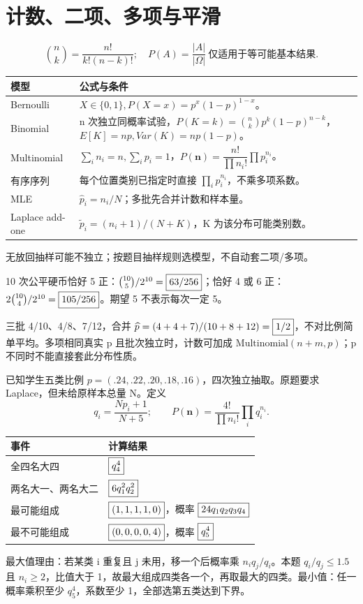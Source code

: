 \section{计数、二项、多项与平滑}\label{sec:prob}
\[
\binom nk=\frac{n!}{k!(n-k)!};\quad
P(A)=\frac{|A|}{|\Omega|}\ \text{仅适用于等可能基本结果}.
\]
\par\noindent\begin{tabularx}{\textwidth}{lY}
\toprule 模型 & 公式与条件\\\midrule
Bernoulli & $X\in\{0,1\},P(X=x)=p^x(1-p)^{1-x}$。\\
Binomial & n 次独立同概率试验，$P(K=k)=\binom nkp^k(1-p)^{n-k}$，$E[K]=np,Var(K)=np(1-p)$。\\
Multinomial & $\sum_i n_i=n,\sum_i p_i=1$，$P(\mathbf n)=\dfrac{n!}{\prod n_i!}\prod p_i^{n_i}$。\\
有序序列 & 每个位置类别已指定时直接 $\prod_i p_i^{n_i}$，不乘多项系数。\\
MLE & $\widehat p_i=n_i/N$；多批先合并计数和样本量。\\
Laplace add-one & $\widetilde p_i=(n_i+1)/(N+K)$，K 为该分布可能类别数。\\\bottomrule
\end{tabularx}\par
无放回抽样可能不独立；按题目抽样规则选模型，不自动套二项/多项。

10 次公平硬币恰好 5 正：$\binom{10}5/2^{10}=\boxed{63/256}$；恰好 4 或 6 正：$2\binom{10}4/2^{10}=\boxed{105/256}$。期望 5 不表示每次一定 5。

三批 4/10、4/8、7/12，合并 $\widehat p=(4+4+7)/(10+8+12)=\boxed{1/2}$，不对比例简单平均。多项相同真实 p 且批次独立时，计数可加成 $\mathrm{Multinomial}(n+m,p)$；p 不同时不能直接套此分布性质。

已知学生五类比例 $p=(.24,.22,.20,.18,.16)$，四次独立抽取。原题要求 Laplace，但未给原样本总量 N。定义
\[
q_i=\frac{Np_i+1}{N+5};\qquad
P(\mathbf n)=\frac{4!}{\prod n_i!}\prod_i q_i^{n_i}.
\]
\begin{center}\begin{tabular}{l|l}\toprule
事件&计算结果\\\midrule
全四名大四&$\boxed{q_4^4}$\\
两名大一、两名大二&$\boxed{6q_1^2q_2^2}$\\
最可能组成&$\boxed{(1,1,1,1,0)}$，概率 $\boxed{24q_1q_2q_3q_4}$\\
最不可能组成&$\boxed{(0,0,0,0,4)}$，概率 $\boxed{q_5^4}$\\\bottomrule
\end{tabular}\end{center}
最大值理由：若某类 i 重复且 j 未用，移一个后概率乘 $n_iq_j/q_i$。本题 $q_i/q_j\le1.5$ 且 $n_i\ge2$，比值大于 1，故最大组成四类各一个，再取最大的四类。最小值：任一概率乘积至少 $q_5^4$，系数至少 1，全部选第五类达到下界。

